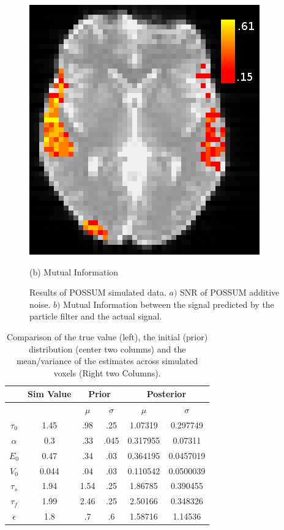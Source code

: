 \documentclass{article}
\begin{document}
\begin{figure}
\begin{minipage}[b]{.49\linewidth}
  \centerline{\includegraphics[width=\textwidth]{sim_hm_mi.png}}
  \centerline{(b) Mutual Information}\medskip
\end{minipage}
\caption{Results of POSSUM simulated data. $a)$ 
SNR of POSSUM additive noise. $b)$ Mutual Information between
the signal predicted by the particle filter and the actual signal.}
\label{fig:PossumResult}
\end{figure}
\begin{table}[t]
\ninept
  \centering
\begin{tabular}{| c | c | c | c | c | c |}
\hline
& Sim Value & \multicolumn{2}{|c|}{Prior} &\multicolumn{2}{|c|}{Posterior} \\
\hline
        &       &$\mu$  & $\sigma$& $\mu$& $\sigma$\\
\hline
$\tau_0  $& 1.45  & .98   & .25     & 1.07319 & 0.297749  \\
\rowcolor[gray]{.8} 
$\alpha  $&0.3    & .33   & .045    & 0.317955& 0.07311  \\
$E_0     $& 0.47  & .34   & .03     & 0.364195& 0.0457019  \\
\rowcolor[gray]{.8} 
$V_0     $& 0.044 & .04   & .03     & 0.110542& 0.0500039  \\
$\tau_s  $& 1.94  & 1.54  & .25     & 1.86785 & 0.390455  \\
\rowcolor[gray]{.8} 
$\tau_f  $& 1.99  & 2.46  & .25     & 2.50166 & 0.348326  \\
$\epsilon$& 1.8   & .7    & .6      & 1.58716 & 1.14536  \\
\hline
\end{tabular}
\caption{Comparison of the true value (left), the initial (prior) distribution
(center two columns) and the 
mean/variance of the estimates across simulated voxels (Right two Columns).} 
\label{tab:beforeafter}
\end{table}
\end{document}
